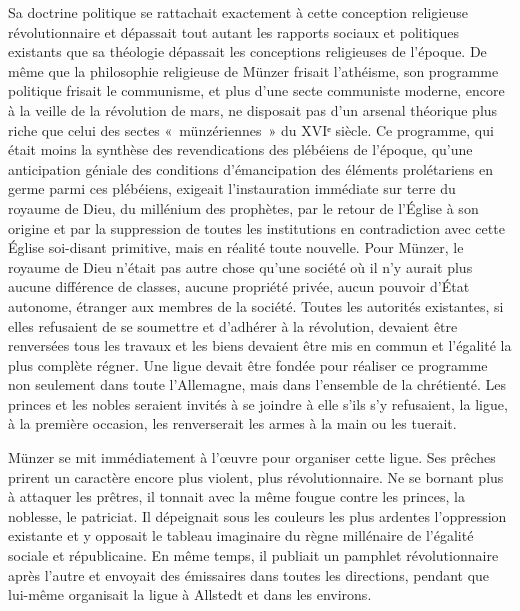 \documentclass[french,twoside]{book} %
\begin{document}
Sa doctrine politique se rattachait exactement à cette conception religieuse révolutionnaire et dépassait tout autant les rapports sociaux et politiques existants que sa théologie dépassait les conceptions religieuses de l’époque. De même que la philosophie religieuse de Münzer frisait l’athéisme, son programme politique frisait le communisme, et plus d’une secte communiste moderne, encore à la veille de la révolution de mars, ne disposait pas d’un arsenal théorique plus riche que celui des sectes « münzériennes » du XVIᵉ siècle. Ce programme, qui était moins la synthèse des revendications des plébéiens de l’époque, qu’une anticipation géniale des conditions d’émancipation des éléments prolétariens en germe parmi ces plébéiens, exigeait l’instauration immédiate sur terre du royaume de Dieu, du millénium des prophètes, par le retour de l’Église à son origine et par la suppression de toutes les institutions en contradiction avec cette Église soi-disant primitive, mais en réalité toute nouvelle. Pour Münzer, le royaume de Dieu n’était pas autre chose qu’une société où il n’y aurait plus aucune différence de classes, aucune propriété privée, aucun pouvoir d’État autonome, étranger aux membres de la société. Toutes les autorités existantes, si elles refusaient de se soumettre et d’adhérer à la révolution, devaient être renversées tous les travaux et les biens devaient être mis en commun et l’égalité la plus complète régner. Une ligue devait être fondée pour réaliser ce programme non seulement dans toute l’Allemagne, mais dans l’ensemble de la chrétienté. Les princes et les nobles seraient invités à se joindre à elle s’ils s’y refusaient, la ligue, à la première occasion, les renverserait les armes à la main ou les tuerait.\par
Münzer se mit immédiatement à l’œuvre pour organiser cette ligue. Ses prêches prirent un caractère encore plus violent, plus révolutionnaire. Ne se bornant plus à attaquer les prêtres, il tonnait avec la même fougue contre les princes, la noblesse, le patriciat. Il dépeignait sous les couleurs les plus ardentes l’oppression existante et y opposait le tableau imaginaire du règne millénaire de l’égalité sociale et républicaine. En même temps, il publiait un pamphlet révolutionnaire après l’autre et envoyait des émissaires dans toutes les directions, pendant que lui-même organisait la ligue à Allstedt et dans les environs.\par
\end{document}
